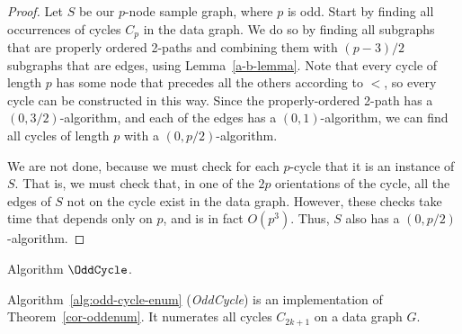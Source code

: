 \begin{proof}
Let $S$ be our $p$-node sample graph, where $p$ is odd.  Start by finding all occurrences of cycles $C_p$ in the data graph.  We do so by finding all subgraphs that are properly ordered 2-paths and combining them with $(p-3)/2$ subgraphs that are edges, using Lemma~\ref{a-b-lemma}.  Note that every cycle of length $p$ has some node that precedes all the others according to $<$, so every cycle can be constructed in this way.  Since the properly-ordered 2-path has a $(0,3/2)$-algorithm, and each of the edges has a $(0,1)$-algorithm, we can find all cycles of length $p$ with a $(0,p/2)$-algorithm.

We are not done, because we must check for each $p$-cycle that it is an instance of $S$.  That is, we must check that, in one of the $2p$ orientations of the cycle, all the edges of $S$ not on the cycle exist in the data graph.  However, these checks take time that depends only on $p$, and is in fact $O(p^3)$.  Thus, $S$ also has a $(0,p/2)$-algorithm.
\end{proof}


\begin{algorithm}[t]
\SetAlgoNoLine
{}


\caption{Algorithm $\OddCycle$.}
\label{alg:odd-cycle-enum}
\end{algorithm}

Algorithm~\ref{alg:odd-cycle-enum} ({\em OddCycle})  is an implementation  of Theorem~\ref{cor-oddenum}.  It numerates all cycles $C_{2k+1}$ on a data graph $G$.

